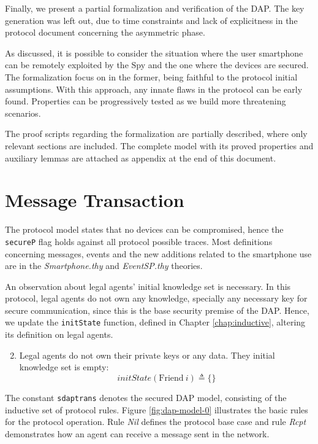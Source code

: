 \label{chap:verification}
Finally, we present a partial formalization and verification of the DAP\@. The key generation was left out, due to time constraints and lack of explicitness in the protocol document concerning the asymmetric phase.

As discussed, it is possible to consider the situation where the user smartphone can be remotely exploited by the Spy and the one where the devices are secured. The formalization focus on in the former, being faithful to the protocol initial assumptions. With this approach, any innate flaws in the protocol can be early found. Properties can be progressively tested as we build more threatening scenarios.

The proof scripts regarding the formalization are partially described, where only relevant sections are included. The complete model with its proved properties and auxiliary lemmas are attached as appendix at the end of this document.

\section{Message Transaction}
The protocol model states that no devices can be compromised, hence the \texttt{secureP} flag holds against all protocol possible traces. Most definitions concerning messages, events and the new additions related to the smartphone use are in the \textit{Smartphone.thy} and \textit{EventSP.thy} theories.

An observation about legal agents' initial knowledge set is necessary. In this protocol, legal agents do not own any knowledge, specially any necessary key for secure communication, since this is the base security premise of the DAP. Hence, we update the \texttt{initState} function, defined in Chapter \ref{chap:inductive}, altering its definition on legal agents.

\begin{enumerate}
  \setcounter{enumi}{1}

  \item Legal agents do not own their private keys or any data. They initial knowledge set is empty:
  \begin{equation*}
    initState (\text{Friend} \ i) \triangleq \{\}
  \end{equation*}
\end{enumerate}

The constant \texttt{sdaptrans} denotes the secured DAP model, consisting of the inductive set of protocol rules. Figure \ref{fig:dap-model-0} illustrates the basic rules for the protocol operation. Rule \textit{Nil} defines the protocol base case and rule \textit{Rcpt} demonstrates how an agent can receive a message sent in the network.

